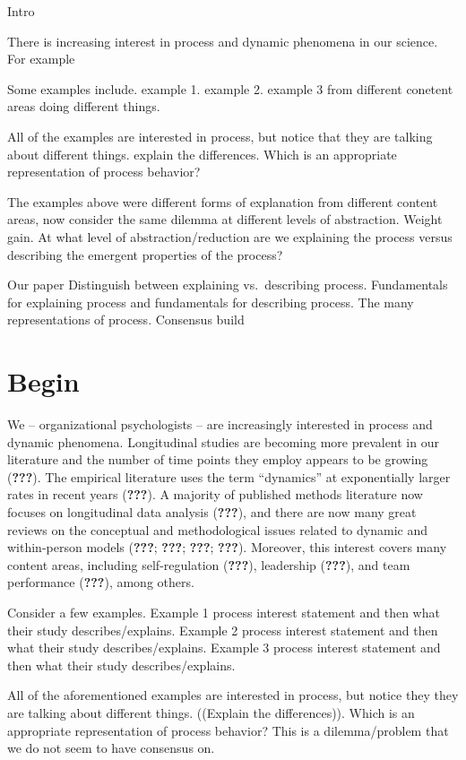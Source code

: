 \documentclass[english,,man]{apa6}
\theoremstyle{definition}
\theoremstyle{definition}
\theoremstyle{definition}
\theoremstyle{remark}
\begin{document}
Intro

There is increasing interest in process and dynamic phenomena in our
science. For example

Some examples include. example 1. example 2. example 3 from different
conetent areas doing different things.

All of the examples are interested in process, but notice that they are
talking about different things. explain the differences. Which is an
appropriate representation of process behavior?

The examples above were different forms of explanation from different
content areas, now consider the same dilemma at different levels of
abstraction. Weight gain. At what level of abstraction/reduction are we
explaining the process versus describing the emergent properties of the
process?

Our paper Distinguish between explaining vs.~describing process.
Fundamentals for explaining process and fundamentals for describing
process. The many representations of process. Consensus build

\hypertarget{begin}{%
\section{Begin}\label{begin}}

We -- organizational psychologists -- are increasingly interested in
process and dynamic phenomena. Longitudinal studies are becoming more
prevalent in our literature and the number of time points they employ
appears to be growing ({\textbf{???}}). The empirical literature uses
the term \enquote{dynamics} at exponentially larger rates in recent
years ({\textbf{???}}). A majority of published methods literature now
focuses on longitudinal data analysis ({\textbf{???}}), and there are
now many great reviews on the conceptual and methodological issues
related to dynamic and within-person models ({\textbf{???}};
{\textbf{???}}; {\textbf{???}}; {\textbf{???}}). Moreover, this interest
covers many content areas, including self-regulation ({\textbf{???}}),
leadership ({\textbf{???}}), and team performance ({\textbf{???}}),
among others.

Consider a few examples. Example 1 process interest statement and then
what their study describes/explains. Example 2 process interest
statement and then what their study describes/explains. Example 3
process interest statement and then what their study describes/explains.

All of the aforementioned examples are interested in process, but notice
they they are talking about different things. ((Explain the
differences)). Which is an appropriate representation of process
behavior? This is a dilemma/problem that we do not seem to have
consensus on.
\end{document}
